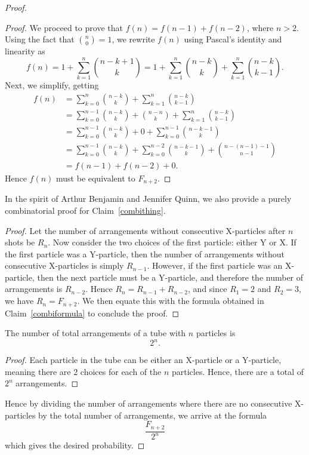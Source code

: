 \begin{proof}
\begin{proof}
  We proceed to prove that $f(n) = f(n-1) + f(n-2)$, where $n > 2$. Using the fact that $\binom{n}{0} = 1$, we rewrite $f(n)$ using Pascal's identity and linearity as \[
    f(n) = 1 + \sum_{k=1}^n \binom{n-k+1}{k} = 1 + \sum_{k=1}^n \binom{n-k}{k} + \sum_{k=1}^n \binom{n-k}{k-1}.
  \] Next, we simplify, getting
  \begin{align*}
    f(n) &= \sum_{k=0}^n \binom{n - k}{k} + \sum_{k=1}^n \binom{n-k}{k-1} \\
         &= \sum_{k=0}^{n-1} \binom{n-k}{k} + \binom{n-n}{k} + \sum_{k=1}^n \binom{n-k}{k-1} \\
         &= \sum_{k=0}^{n-1} \binom{n-k}{k} + 0 + \sum_{k=0}^{n-1} \binom{n-k-1}{k} \\
         &= \sum_{k=0}^{n-1} \binom{n-k}{k} + \sum_{k=0}^{n-2} \binom{n-k-1}{k} + \binom{n-(n-1)-1}{n-1} \\
         &= f(n-1) + f(n-2) + 0.
  \end{align*}
  Hence $f(n)$ must be equivalent to $F_{n+2}$.
\end{proof}
In the spirit of Arthur Benjamin and Jennifer Quinn\cite{downfall}, we also provide a purely combinatorial proof for Claim~\ref{combithing}.
\begin{proof}
  Let the number of arrangements without consecutive X-particles after $n$ shots be $R_n$. Now consider the two choices of the first particle: either Y or X. If the first particle was a Y-particle, then the number of arrangements without consecutive X-particles is simply $R_{n-1}$. However, if the first particle was an X-particle, then the next particle must be a Y-particle, and therefore the number of arrangements is $R_{n-2}$. Hence $R_{n} = R_{n-1} + R_{n-2}$, and since $R_1 = 2$ and  $R_2 = 3$, we have $R_{n} = F_{n+2}$. We then equate this with the formula obtained in Claim~\ref{combiformula} to conclude the proof.
\end{proof}
\begin{claim}
  The number of total arrangements of a tube with $n$ particles is \[2^n.\]
\end{claim}
\begin{proof}
  Each particle in the tube can be either an X-particle or a Y-particle, meaning there are 2 choices for each of the $n$ particles. Hence, there are a total of $2^n$ arrangements.
\end{proof}
Hence by dividing the number of arrangements where there are no consecutive X-particles by the total number of arrangements, we arrive at the formula \[\frac{F_{n+2}}{2^n}\] which gives the desired probability.
\end{proof}

